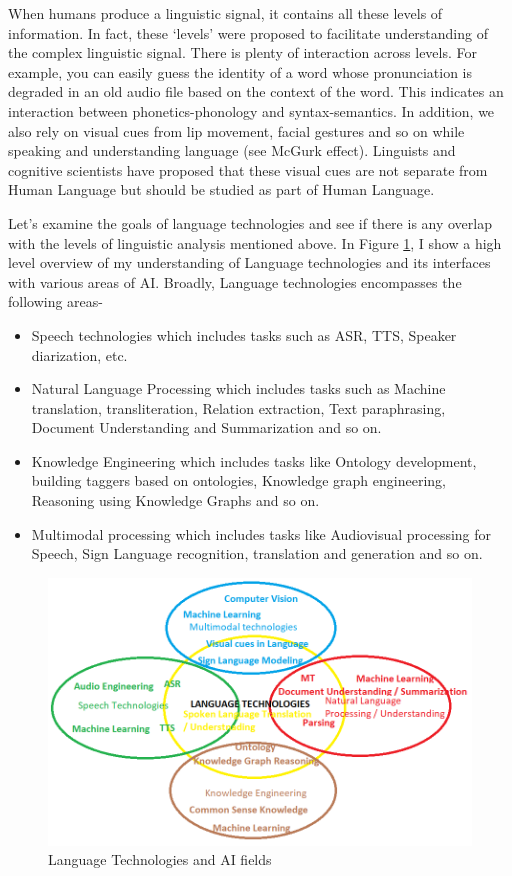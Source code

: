 \documentclass{article}
\begin{document}
When humans produce a linguistic signal, it contains all these levels of information. In fact, these `levels' were proposed to facilitate understanding of the complex linguistic signal. There is plenty of interaction across levels. For example, you can easily guess the identity of a word whose pronunciation is degraded in an old audio file based on the context of the word. This indicates an interaction between phonetics-phonology and syntax-semantics. In addition, we also rely on visual cues from lip movement, facial gestures and so on while speaking and understanding language (see McGurk effect). Linguists and cognitive scientists have proposed that these visual cues are not separate from Human Language but should be studied as part of Human Language.

Let's examine the goals of language technologies and see if there is any overlap with the levels of linguistic analysis mentioned above. In Figure \ref{fig:langtech}, I show a high level overview of my understanding of Language technologies and its interfaces with various areas of AI. Broadly, Language technologies encompasses the following areas- 
\begin{itemize}
    \item Speech technologies which includes tasks such as ASR, TTS, Speaker diarization, etc. 
    \item Natural Language Processing which includes tasks such as Machine translation, transliteration, Relation extraction, Text paraphrasing, Document Understanding and Summarization and so on.
    \item Knowledge Engineering which includes tasks like Ontology development, building taggers based on ontologies, Knowledge graph engineering, Reasoning using Knowledge Graphs and so on. 
    \item Multimodal processing which includes tasks like Audiovisual processing for Speech, Sign Language recognition, translation and generation and so on. 
\end{itemize}

\begin{figure}
    \centering
    \includegraphics[scale=0.75]{languagetechnologies.png}
    \caption{Language Technologies and AI fields}
    \label{fig:langtech}
\end{figure}
\end{document}
